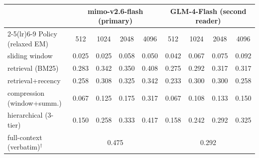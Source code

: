 \begin{tabular}{lcccc|cccc}
\toprule
 & \multicolumn{4}{c|}{mimo-v2.6-flash (primary)} & \multicolumn{4}{c}{GLM-4-Flash (second reader)} \\
\cmidrule(lr){2-5}\cmidrule(lr){6-9}
Policy (relaxed EM) & 512 & 1024 & 2048 & 4096 & 512 & 1024 & 2048 & 4096 \\
\midrule
sliding window & 0.025 & 0.025 & 0.058 & 0.050 & 0.042 & 0.067 & 0.075 & 0.092 \\
retrieval (BM25) & 0.283 & 0.342 & 0.350 & 0.408 & 0.275 & 0.292 & 0.317 & 0.317 \\
retrieval+recency & 0.258 & 0.308 & 0.325 & 0.342 & 0.233 & 0.300 & 0.300 & 0.258 \\
compression (window+summ.) & 0.067 & 0.125 & 0.175 & 0.317 & 0.067 & 0.108 & 0.133 & 0.150 \\
hierarchical (3-tier) & 0.150 & 0.258 & 0.333 & 0.417 & 0.158 & 0.242 & 0.292 & 0.325 \\
\midrule
full-context (verbatim)$^{\dagger}$ & \multicolumn{4}{c|}{0.475} & \multicolumn{4}{c}{0.292} \\
\bottomrule
\end{tabular}
